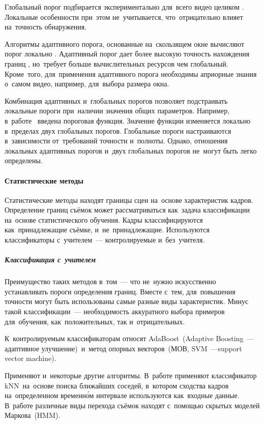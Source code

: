 Глобальный порог подбирается экспериментально
для~всего видео целиком \cite{Cernekova:2006}.
Локальные особенности при~этом не~учитывается,
что~отрицательно влияет на~точность обнаружения.

Алгоритмы адаптивного порога,
основанные на~скользящем окне вычисляют порог локально
\cite{Hoi:2006} \cite{Wu:2008}.
Адаптивный порог дает более высокую точность
нахождения границ \cite{Hanjalic:2002}, но~требует больше
вычислительных ресурсов чем глобальный.
Кроме~того, для~применения адаптивного порога необходимы априорные знания
о~самом видео, например, для~выбора размера окна.

Комбинация адаптивных и~глобальных порогов позволяет
подстраивать локальные пороги при~наличии значения общих параметров.
Например, в~работе~\cite{Quenot:2003} введена пороговая функция.
Значение функции изменяется локально в~пределах двух глобальных порогов.
Глобальные пороги настраиваются в~зависимости
от~требований точности и~полноты.
Однако, отношения локальных адаптивных порогов
и~двух глобальных порогов не~могут быть легко определены.

\paragraph{Статистические методы}

Статистические методы находят границы сцен на~основе характеристик кадров.
Определение границ съёмок может рассматриваться как~задача классификации
на~основе статистического обучения. Кадры классифицируются
как~принадлежащие съёмке, и~не~принадлежащие.
Используются классификаторы с~учителем~— контролируемые и~без~учителя.

\subparagraph{Классификация  с~учителем}

Преимущество таких методов в~том~— что
не~нужно искусственно устанавливать пороги определения границ.
Вместе с~тем, для~повышения точности могут быть использованы
самые разные виды характеристик.
Минус такой классификации~— необходимость аккуратного
выбора примеров для~обучения,
как~положительных, так и~отрицательных.

К~контролируемым классификаторам относят AdaBoost\ (Adaptive
Boosting~—адаптивное улучшение)\ и~метод
опорных векторов\ (МОВ,
SVM~—support vector machine).

Применяют и~некоторые другие алгоритмы.
В~работе  \cite{Cooper:2007} применяют классификатор
kNN\ на~основе поиска ближайших соседей,
в~котором сходства кадров на~определенном временно́м интервале используются
как~входные данные.
В~работе \cite{Boreczky:1998} различные виды перехода съёмок находят
с~помощью скрытых моделей Маркова\ (HMM).

